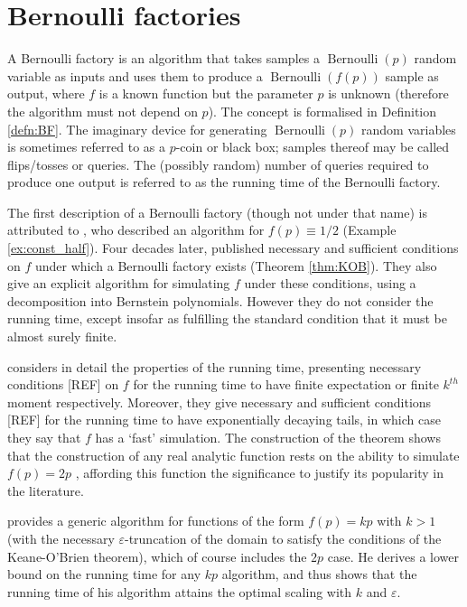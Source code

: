 \documentclass{article}
\theoremstyle{definition}
\newcommand{\Bern}{\operatorname{Bernoulli}}
\begin{document}
\section{Bernoulli factories}\label{sec:BFs}
A Bernoulli factory is an algorithm that takes samples a $\Bern(p)$ random variable as inputs and uses them to produce a $\Bern(f(p))$ sample as output, where $f$ is a known function but the parameter $p$ is unknown (therefore the algorithm must not depend on $p$). The concept is formalised in Definition \ref{defn:BF}.
The imaginary device for generating $\Bern(p)$ random variables is sometimes referred to as a $p$-coin or black box; samples thereof may be called flips/tosses or queries.
The (possibly random) number of queries required to produce one output is referred to as the running time of the Bernoulli factory.

The first description of a Bernoulli factory (though not under that name) is attributed to \citet{vonneumann1951}, who described an algorithm for $f(p)\equiv 1/2$ (Example \ref{ex:const_half}).
Four decades later, \citep{keane1994} published necessary and sufficient conditions on $f$ under which a Bernoulli factory exists (Theorem \ref{thm:KOB}). They also give an explicit algorithm for simulating $f$ under these conditions, using a decomposition into Bernstein polynomials. However they do not consider the running time, except insofar as fulfilling the standard condition that it must be almost surely finite.

\citet{nacu2005}%
considers in detail the properties of the running time, presenting necessary conditions [REF] on $f$ for the running time to have finite expectation or finite $k^{th}$ moment respectively. Moreover, they give necessary and sufficient conditions [REF] for the running time to have exponentially decaying tails, in which case they say that $f$ has a `fast' simulation.
The construction of the theorem shows that the construction of any real analytic function rests on the ability to simulate $f(p)=2p$ \citep[Proposition 14(iii)]{nacu2005}, affording this function the significance to justify its popularity in the literature.

\citet{huber2016} provides a generic algorithm for functions of the form $f(p)=kp$ with $k>1$ (with the necessary $\varepsilon$-truncation of the domain to satisfy the conditions of the Keane-O'Brien theorem), which of course includes the $2p$ case. He derives a lower bound on the running time for any $kp$ algorithm, and thus shows that the running time of his algorithm attains the optimal scaling with $k$ and $\varepsilon$.
\end{document}
